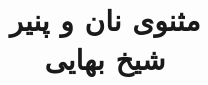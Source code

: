 \documentclass[14pt,b5paper]{article}
\begin{document}
\title{\Huge مثنوی نان و پنیر \\
شیخ بهایی}
\author{ }
\date{ }
\maketitle
\newpage
\tableofcontents
\newpage

\newpage

\newpage

\newpage

\newpage

\newpage

\newpage

\newpage

\newpage

\newpage

\newpage

\newpage

\newpage

\newpage

\newpage

\newpage
\end{document}
